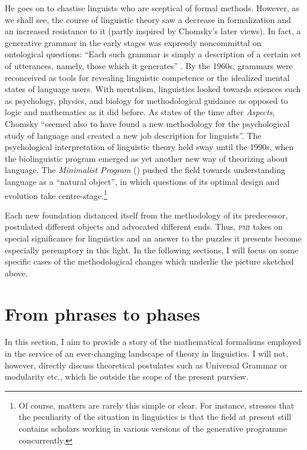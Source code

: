 \documentclass[output=paper]{langscibook}
\begin{document}
He goes on to chastise linguists who are sceptical of formal methods. However, as we shall see, the course of linguistic theory saw a decrease in formalization and an increased resistance to it (partly inspired by Chomsky's later views). In fact, a generative grammar in the early stages was expressly noncommittal on ontological questions: ``Each such grammar is simply a description of a certain set of utterances, namely, those which it generates'' \citep[48]{Chomsky1957}. By the 1960s, grammars were reconceived as tools for revealing linguistic competence or the idealized mental states of language users. With mentalism, linguistics looked towards sciences such as psychology, physics, and biology for methodological guidance as opposed to logic and mathematics as it did before. As \cite[167]{Cowie1999} states of the time after \emph{Aspects}, Chomsky ``seemed also to have found a new methodology for the psychological study of language and created a new job description for linguists''. The psychological interpretation of linguistic theory held sway until the 1990s, when the biolinguistic program emerged as yet another new way of theorizing about language. The \emph{Minimalist Program} (\citeyear{Chomsky1995MP}) pushed the field towards understanding language as a ``natural object'', in which questions of its optimal design and evolution take centre-stage.\footnote{Of course, matters are rarely this simple or clear. For instance, \cite{Bickerton2014} stresses that the peculiarity of the situation in linguistics is that the field at present still contains scholars working in various versions of the generative programme concurrently.}

Each new foundation distanced itself from the methodology of its predecessor, postulated different objects and advocated different ends. Thus, \textsc{pmi} takes on special significance for linguistics and an answer to the puzzles it presents become especially peremptory in this light. In the following sections, I will focus on some specific cases of the methodological changes which underlie the picture sketched above. 


\section{From phrases to phases}
\label{sec:nefdt:phrasephase}

In this section, I aim to provide a story of the mathematical formalisms employed in the service of an ever-changing landscape of theory in linguistics. I will not, however, directly discuss theoretical postulates such as Universal Grammar or modularity etc., which lie outside the scope of the present purview.
\end{document}
